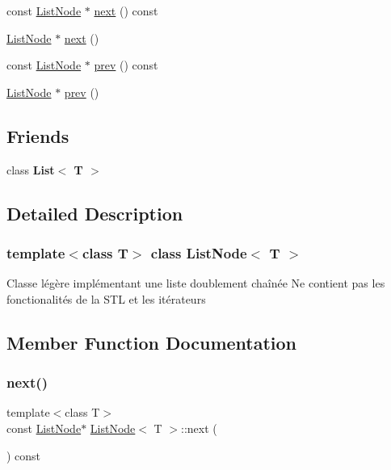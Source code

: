 \begin{DoxyCompactItemize}
const \hyperlink{classListNode}{List\+Node} $\ast$ \hyperlink{classListNode_a2c3087e44d5a831314487615359d73e3}{next} () const
\item 
\hyperlink{classListNode}{List\+Node} $\ast$ \hyperlink{classListNode_aed1d6545a0edaa21796290ea8977cb53}{next} ()
\item 
const \hyperlink{classListNode}{List\+Node} $\ast$ \hyperlink{classListNode_a2365b3baf31c7507a86c810f40c922a2}{prev} () const
\item 
\hyperlink{classListNode}{List\+Node} $\ast$ \hyperlink{classListNode_a6a80942f4de46fbe065062360e29fee6}{prev} ()
\end{DoxyCompactItemize}
\subsection*{Friends}
\begin{DoxyCompactItemize}
\item 
\mbox{\label{classListNode_adfa51a0eca1eba953f68ca3f65cdaa05}} 
class {\bfseries List$<$ T $>$}
\end{DoxyCompactItemize}


\subsection{Detailed Description}
\subsubsection*{template$<$class T$>$\newline
class List\+Node$<$ T $>$}

Classe légère implémentant une liste doublement chaînée Ne contient pas les fonctionalités de la S\+TL et les itérateurs 

\subsection{Member Function Documentation}
\mbox{\label{classListNode_a2c3087e44d5a831314487615359d73e3}} 
\subsubsection{\texorpdfstring{next()}{next()}\hspace{0.1cm}{\footnotesize\ttfamily [1/2]}}
{\footnotesize\ttfamily template$<$class T$>$ \\
const \hyperlink{classListNode}{List\+Node}$\ast$ \hyperlink{classListNode}{List\+Node}$<$ T $>$\+::next (\begin{DoxyParamCaption}{ }\end{DoxyParamCaption}) const\hspace{0.3cm}{\ttfamily [inline]}}


